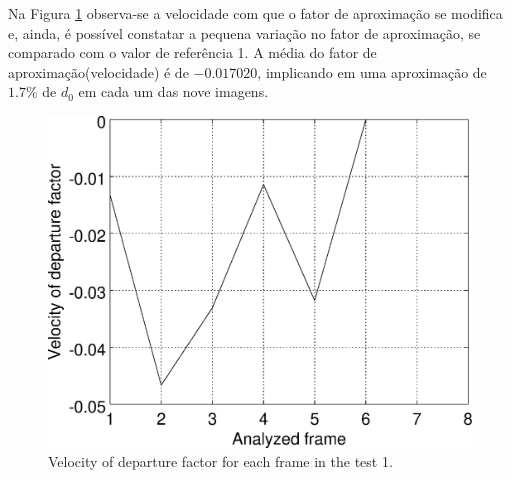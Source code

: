 Na Figura \ref{fig:res_graph1v} observa-se a velocidade com que o fator de aproximação se modifica e, ainda,
é possível constatar a pequena variação no fator de aproximação, se comparado
com o valor de referência 1. A média do fator de aproximação(velocidade) é de $-0.017020$, implicando
em uma aproximação de $1.7\%$ de $d_0$ em cada um das nove imagens.

\begin{figure}[!hbt]
\centering
\includegraphics[width=0.8\columnwidth]{images/graph1v.eps}
\caption{Velocity of departure factor for each frame in the test 1.}
\label{fig:res_graph1v}
\end{figure}
